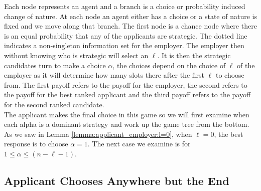 \documentclass{article}
\begin{document}
Each node represents an agent and a branch is a choice or probability induced change of nature. At each node an agent either has a choice or a state of nature is fixed and we move along that branch. The first node is a chance node where there is an equal probability that any of the applicants are strategic. The dotted line indicates a non-singleton information set for the employer. The employer then without knowing who is strategic will select an $\ell$. It is then the strategic candidates turn to make a choice $\alpha$, the choices depend on the choice of $\ell$ of the employer as it will determine how many slots there after the first $\ell$ to choose from. The first payoff refers to the payoff for the employer, the second refers to the payoff for the best ranked applicant and the third payoff refers to the payoff for the second ranked candidate.
\\[2ex]
The applicant makes the final choice in this game so we will first examine when each alpha is a dominant strategy and work up the game tree from the bottom. As we saw in Lemma \ref{lemma:applicant_employer:l=0}, when $\ell=0$, the best response is to choose $\alpha = 1$. The next case we examine is for $1 \leq \alpha \leq (n-\ell-1)$. 

\subsection{Applicant Chooses Anywhere but the End }
\end{document}
